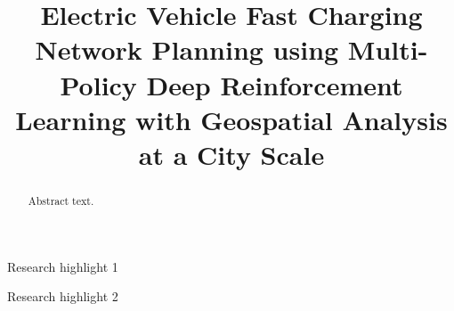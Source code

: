 \documentclass[preprint,12pt]{elsarticle}
\begin{document}
\begin{frontmatter}



\title{Electric Vehicle Fast Charging Network Planning using Multi-Policy Deep Reinforcement Learning with Geospatial Analysis at a City Scale} %


\author{} %


\begin{abstract}
Abstract text.
\end{abstract}


\begin{highlights}
\item Research highlight 1
\item Research highlight 2
\end{highlights}

\begin{keyword}



\end{keyword}

\end{frontmatter}
\end{document}
